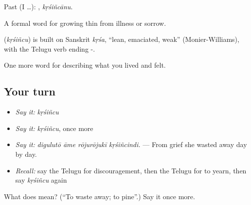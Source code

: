 Past (I …): , \emph{kṛśiñcānu}.

A formal word for growing thin from illness or sorrow.

\begin{cousinweb}
\textbf{} (\emph{kṛśiñcu}) is built on Sanskrit \emph{kṛśa}, \textquotedblleft{}lean, emaciated, weak\textquotedblright{} (Monier-Williams), with the Telugu verb ending -.
\end{cousinweb}

\begin{grammarlens}[title={What you've built}]
One more word for describing what you lived and felt.
\end{grammarlens}

\subsection*{Your turn}
\begin{itemize}
\raggedright
  \item \emph{Say it:} \emph{kṛśiñcu}
  \item \emph{Say it:} \emph{kṛśiñcu}, once more
  \item \emph{Say it:} \emph{digulutō āme rōjurōjukī kṛśiñcindi.} — From grief she wasted away day by day.
  \item \emph{Recall:} say the Telugu for discouragement, then the Telugu for to yearn, then say \emph{kṛśiñcu} again
\end{itemize}

\begin{tcolorbox}[breakable,colback=teal!4,colframe=teal!35!black,title={Before you move on}]
What does  mean? (\textquotedblleft{}To waste away; to pine\textquotedblright{}.) Say it once more.
\end{tcolorbox}
